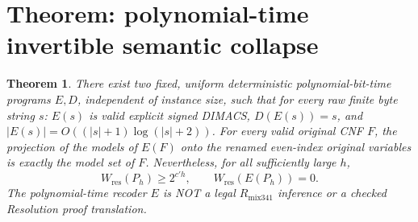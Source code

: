 \documentclass[11pt]{article}
\newtheorem{theorem}{Theorem}
\begin{document}
\section*{Theorem: polynomial-time invertible semantic collapse}
\begin{theorem}
There exist two fixed, uniform deterministic polynomial-bit-time programs \(E,D\), independent of instance size, such that for every raw finite byte string \(s\): \(E(s)\) is valid explicit signed DIMACS, \(D(E(s))=s\), and \(|E(s)|=O((|s|+1)\log(|s|+2))\). For every \emph{valid} original CNF \(F\), the projection of the models of \(E(F)\) onto the renamed even-index original variables is exactly the model set of \(F\). Nevertheless, for all sufficiently large \(h\),
\[
W_{\mathrm{res}}(P_h)\ge2^{c'h},\qquad W_{\mathrm{res}}(E(P_h))=0 .
\]
The polynomial-time recoder \(E\) is NOT a legal \(R_{\mathrm{mix341}}\) inference or a checked Resolution proof translation.
\end{theorem}
\end{document}

